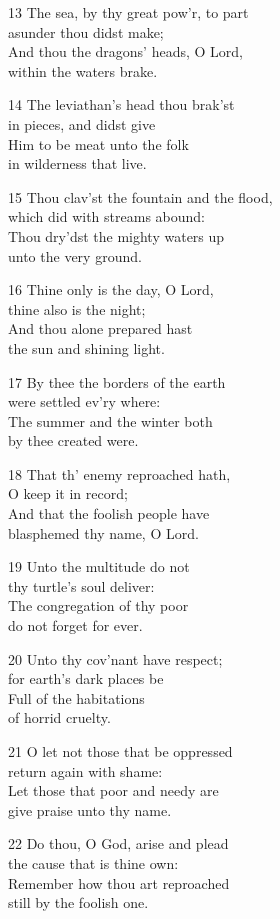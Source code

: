 13 The sea, by thy great pow’r, to part\\
asunder thou didst make;\\
And thou the dragons’ heads, O Lord,\\
within the waters brake.

14 The leviathan’s head thou brak’st\\
in pieces, and didst give\\
Him to be meat unto the folk\\
in wilderness that live.

15 Thou clav’st the fountain and the flood,\\
which did with streams abound:\\
Thou dry’dst the mighty waters up\\
unto the very ground.

16 Thine only is the day, O Lord,\\
thine also is the night;\\
And thou alone prepared hast\\
the sun and shining light.

17 By thee the borders of the earth\\
were settled ev’ry where:\\
The summer and the winter both\\
by thee created were.

18 That th’ enemy reproached hath,\\
O keep it in record;\\
And that the foolish people have\\
blasphemed thy name, O Lord.

19 Unto the multitude do not\\
thy turtle’s soul deliver:\\
The congregation of thy poor\\
do not forget for ever.

20 Unto thy cov’nant have respect;\\
for earth’s dark places be\\
Full of the habitations\\
of horrid cruelty.

21 O let not those that be oppressed\\
return again with shame:\\
Let those that poor and needy are\\
give praise unto thy name.

22 Do thou, O God, arise and plead\\
the cause that is thine own:\\
Remember how thou art reproached\\
still by the foolish one.

